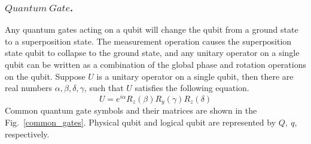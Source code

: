 \documentclass[runningheads]{llncs}
\begin{document}
\subsubsection{$Quantum \ Gate$.}
Any quantum gates acting on a qubit will change the qubit from a ground state to a superposition state. 
The measurement operation causes the superposition state qubit to collapse to the ground state, 
and any unitary operator on a single qubit can be written as a combination of the global phase and 
rotation operations on the qubit. Suppose $U$ is a unitary operator on a single qubit,
 then there are real numbers $\alpha, \beta, \delta, \gamma$,  such that $U$ satisfies the following equation.
 \begin{equation}
	U=e^{i\alpha}R_{z}(\beta)R_{y}(\gamma)R_{z}(\delta)
\end{equation}
Common quantum gate symbols and their matrices are shown in the Fig.~\ref{common_gates}. 
Physical qubit and logical qubit are represented by $Q ,\ q $, respectively.
\end{document}
